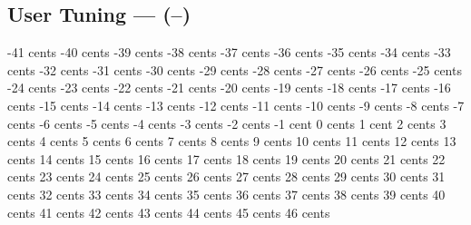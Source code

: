 \subsection[User Tuning]{User Tuning --- \UiKey{\I}\UiKey{\SET}(--)}
-41 cents
-40 cents
-39 cents
-38 cents
-37 cents
-36 cents
-35 cents
-34 cents
-33 cents
-32 cents
-31 cents
-30 cents
-29 cents
-28 cents
-27 cents
-26 cents
-25 cents
-24 cents
-23 cents
-22 cents
-21 cents
-20 cents
-19 cents
-18 cents
-17 cents
-16 cents
-15 cents
-14 cents
-13 cents
-12 cents
-11 cents
-10 cents
-9  cents
-8  cents
-7  cents
-6  cents
-5  cents
-4  cents
-3  cents
-2  cents
-1  cent
0   cents
1   cent
2   cents
3   cents
4   cents
5   cents
6   cents
7   cents
8   cents
9   cents
10  cents
11  cents
12  cents
13  cents
14  cents
15  cents
16  cents
17  cents
18  cents
19  cents
20  cents
21  cents
22  cents
23  cents
24  cents
25  cents
26  cents
27  cents
28  cents
29  cents
30  cents
31  cents
32  cents
33  cents
34  cents
35  cents
36  cents
37  cents
38  cents
39  cents
40  cents
41  cents
42  cents
43  cents
44  cents
45  cents
46  cents
